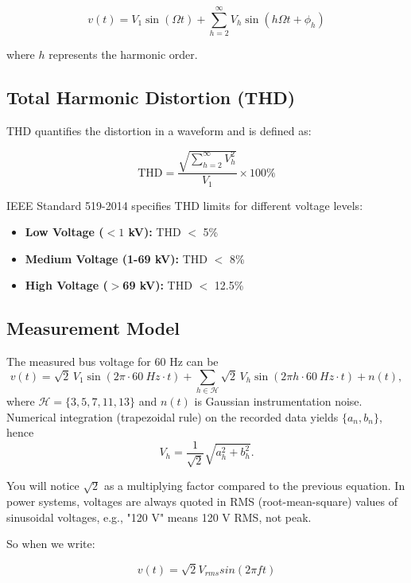 \documentclass[nohyper,nobib,xcolor=dvipsnames,svgnames,x11names]{tufte-book}
\begin{document}
\begin{equation}
v(t) = V_1 \sin(\Omega t) + \sum_{h=2}^{\infty} V_h \sin(h\Omega t + \phi_h)
\end{equation}

where $h$ represents the harmonic order.

\subsection{Total Harmonic Distortion (THD)}

THD quantifies the distortion in a waveform and is defined as:

\begin{equation}
\text{THD} = \frac{\sqrt{\sum_{h=2}^{\infty} V_h^2}}{V_1} \times 100\%
\end{equation}

IEEE Standard 519-2014 specifies THD limits for different voltage levels:
\begin{itemize}
\item \textbf{Low Voltage ($<1$ kV):} THD $<$ 5\%
\item \textbf{Medium Voltage (1-69 kV):} THD $<$ 8\%
\item \textbf{High Voltage ($>$69 kV):} THD $<$ 12.5\%
\end{itemize}


\subsection{Measurement Model}
The measured bus voltage for 60 Hz can be
\begin{equation}
v(t)=\sqrt{2}\,V_{1}\sin(2\pi\cdot\SI{60}{Hz}\cdot t)+\sum_{h\in\mathcal{H}}\sqrt{2}\,V_{h}\sin(2\pi h\cdot\SI{60}{Hz}\cdot t)+n(t),
\end{equation}
where $\mathcal{H}=\{3,5,7,11,13\}$ and $n(t)$ is Gaussian instrumentation noise.  
Numerical integration (trapezoidal rule) on the recorded data yields $\{a_{n},b_{n}\}$, hence
\begin{equation}
V_{h}=\frac{1}{\sqrt{2}}\sqrt{a_{h}^{2}+b_{h}^{2}}.
\end{equation}

You will notice $\sqrt{2}$ as a multiplying factor compared to the previous equation. In power systems, voltages are always quoted in RMS (root-mean-square) values of sinusoidal voltages, e.g., "120 V" means 120 V RMS, not peak.

So when we write:

$$
v(t) = \sqrt{2}V_{rms}sin(2\pi f t)
$$
\end{document}
